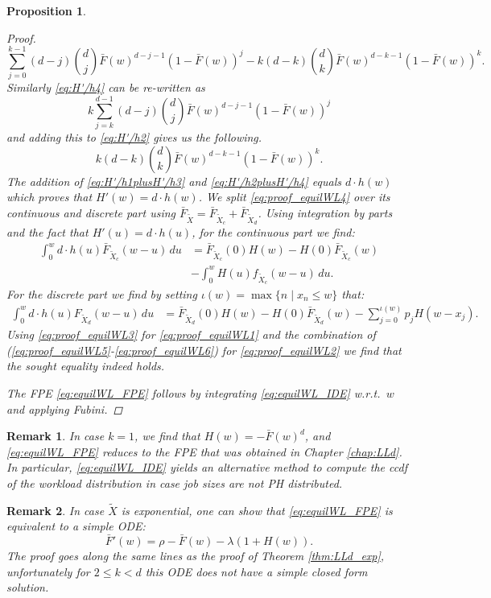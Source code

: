 \documentclass[12pt]{report}
\newtheorem{remark}{Remark}
\newtheorem{proposition}[theorem]{Proposition}
\begin{document}
\begin{proposition}
\begin{proof}
\begin{equation}
\sum_{j=0}^{k-1} (d-j) \binom{d}{j} \bar F(w)^{d-j-1} (1-\bar F(w))^j -k (d-k) \binom{d}{k} \bar F(w)^{d-k-1} (1-\bar F(w))^k. \label{eq:H'/h1plusH'/h3}
\end{equation}
Similarly \eqref{eq:H'/h4} can be re-written as
$$
k \sum_{j=k}^{d-1} (d-j) \binom{d}{j} \bar F(w)^{d-j-1} (1-\bar F(w))^j
$$
and adding this to \eqref{eq:H'/h2} gives us the following.
\begin{equation}
k(d-k) \binom{d}{k} \bar F(w)^{d-k-1} (1-\bar F(w))^k. \label{eq:H'/h2plusH'/h4}
\end{equation}
The addition of \eqref{eq:H'/h1plusH'/h3} and \eqref{eq:H'/h2plusH'/h4} equals $d\cdot h(w)$ which proves that $H'(w)=d\cdot h(w)$.
We split \eqref{eq:proof_equilWL4} over its continuous and discrete part using $\bar F_{\tilde{X}}= \bar F_{\tilde{X}_c} + \bar F_{\tilde{X}_d}$. 
Using integration by parts and the fact that $H'(u)=d\cdot h(u)$, for the continuous part we find:
\begin{align}
\int_0^w d\cdot h(u) \bar F_{\tilde{X}_c}(w-u)\, du &= \bar F_{\tilde{X}_c}(0) H(w) - H(0) \bar F_{\tilde{X}_c}(w)\nonumber\\
& - \int_0^w H(u) f_{\tilde{X}_c}(w-u)\, du. \label{eq:proof_equilWL5}
\end{align}
For the discrete part we find by setting $\iota(w)=\max\{n \mid x_n \leq w\}$ that:
\begin{align}
\int_0^w d\cdot h(u) F_{\tilde{X}_d}(w-u)\, du &= \bar F_{\tilde{X}_d}(0) H(w)-H(0) \bar F_{\tilde{X}_d}(w) - \sum_{j=0}^{\iota(w)} p_j H(w-x_j).\label{eq:proof_equilWL6}
\end{align}
Using \eqref{eq:proof_equilWL3} for \eqref{eq:proof_equilWL1} and the combination of (\ref{eq:proof_equilWL5}-\ref{eq:proof_equilWL6}) for \eqref{eq:proof_equilWL2} we find that the sought equality indeed holds.

The FPE \eqref{eq:equilWL_FPE} follows by integrating \eqref{eq:equilWL_IDE} w.r.t.~$w$ and applying Fubini.
\end{proof}
\end{proposition}
\begin{remark}
In case $k=1$, we find that $H(w)=-\bar F(w)^d$, and \eqref{eq:equilWL_FPE} reduces to the FPE that was obtained in Chapter \ref{chap:LLd}. In particular, \eqref{eq:equilWL_IDE} yields an alternative method to compute the ccdf of the workload distribution in case job sizes are not PH distributed.
\end{remark}
\begin{remark}
In case $\tilde X$ is exponential, one can show that \eqref{eq:equilWL_FPE} is equivalent to a simple ODE:
\begin{equation}\label{eq:ODE_LLdk}
\bar F'(w) = \rho - \bar F(w) - \lambda (1+H(w)).
\end{equation}
The proof goes along the same lines as the proof of Theorem \ref{thm:LLd_exp}, unfortunately for $2 \leq k < d$ this ODE does not have a simple closed form solution.
\end{remark}
\end{document}
